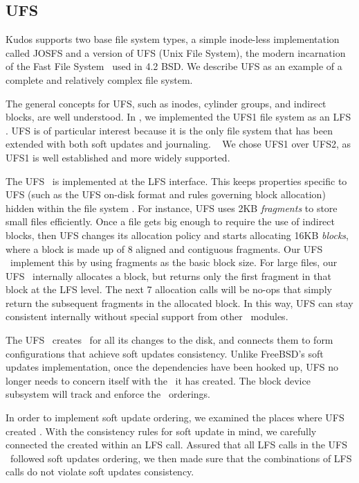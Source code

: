 
\subsection{UFS}
\label{sec:modules:ufs}

Kudos supports two base file system types, a simple inode-less
implementation called JOSFS and a version of UFS (Unix File System), the
modern incarnation of the Fast File System~\cite{mckusick84fast} used in
4.2 BSD. 
%
We describe UFS as an example of a complete and relatively complex file
system.

The general concepts for UFS, such as inodes, cylinder groups, and
indirect blocks, are well understood.  In \Kudos, we implemented the UFS1
file system as an LFS \module. UFS is of particular interest because it is
the only file system that has been extended with both soft updates and
journaling. ~\cite{seltzer00journaling} We chose UFS1 over UFS2, as UFS1 is
well established and more widely supported.

The UFS \module\ is implemented at the LFS interface. This keeps properties
specific to UFS (such as the UFS on-disk format and rules governing block
allocation) hidden within the file system \module. For instance, UFS uses
2KB \emph{fragments} to store small files efficiently. Once a file gets big
enough to require the use of indirect blocks, then UFS changes its allocation
policy and starts allocating 16KB \emph{blocks}, where a block is made up of 8
aligned and contiguous fragments. Our UFS \module\ implement this by using
fragments as the basic block size. For large files, our UFS \module\ internally
allocates a block, but returns only the first fragment in that block at the LFS
level. The next 7 allocation calls will be no-ops that simply return the
subsequent fragments in the allocated block. In this way, UFS can stay
consistent internally without special support from other \Kudos\ modules.

The UFS \module\ creates \chdescs\ for all its changes to the disk, and
connects them to form configurations that achieve soft updates consistency.
Unlike FreeBSD's soft updates implementation, once the dependencies have been
hooked up, UFS no longer needs to concern itself with the \chdescs\ it has
created. The block device subsystem will track and enforce the
\chdesc\ orderings.

In order to implement soft update ordering, we examined the places where UFS
created \chdescs. With the consistency rules for soft update in mind, we
carefully connected the \chdescs created within an LFS call. Assured that
all LFS calls in the UFS \module\ followed soft updates ordering, we then made
sure that the combinations of LFS calls do not violate soft updates
consistency.

